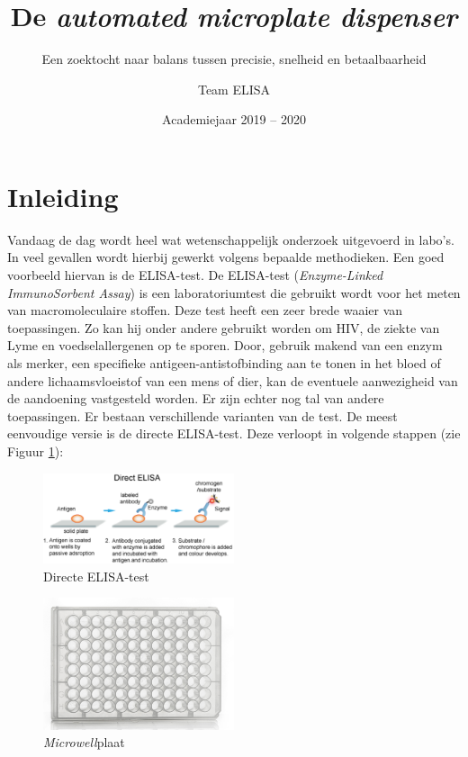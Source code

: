 \documentclass[a4paper,twoside,kulak]{kulakreport} %
\title{De \textit{automated microplate dispenser}}
\subtitle{Een zoektocht naar balans tussen precisie, snelheid en betaalbaarheid}
\author{Team ELISA}
\institute{Matthias Derez, Maxime Dujardin, Korneel Verkens, Seppe Vilain}
\date{Academiejaar 2019 -- 2020}
\begin{document}

\titlepage

\tableofcontents

\chapter*{Inleiding}

Vandaag de dag wordt heel wat wetenschappelijk onderzoek uitgevoerd in labo's. In veel gevallen wordt hierbij gewerkt volgens bepaalde methodieken. Een goed voorbeeld hiervan is de ELISA-test. De ELISA-test (\textit{Enzyme-Linked ImmunoSorbent Assay}\cite{naamELISA}) is een laboratoriumtest die gebruikt wordt voor het meten van macromoleculaire stoffen. Deze test heeft een zeer brede waaier van toepassingen. Zo kan hij onder andere gebruikt worden om HIV, de ziekte van Lyme en voedselallergenen op te sporen. Door, gebruik makend van een enzym als merker, een specifieke antigeen-antistofbinding aan te tonen in het bloed of andere lichaamsvloeistof van een mens of dier, kan de eventuele aanwezigheid van de aandoening vastgesteld worden. Er zijn echter nog tal van andere toepassingen\cite{ELISAApplications}.  
\newline
Er bestaan verschillende varianten van de test. De meest eenvoudige versie is de directe ELISA-test. Deze verloopt in volgende stappen (zie Figuur \ref{fig: directe ELISA})\cite{AfbeeldingdirectELISA}:

\begin{figure}[h]
	\centering
	\includegraphics[width=0.5\textwidth]{ELISA.png}
	\caption{Directe ELISA-test}
	\label{fig: directe ELISA}
	
\end{figure} 


\begin{figure}[h]
	\centering
	\includegraphics[width=0.5\textwidth]{microplate.png}
	\caption{\textit{Microwell}plaat}
	\label{fig: microwellplaat}
	
\end{figure} 
\end{document}
